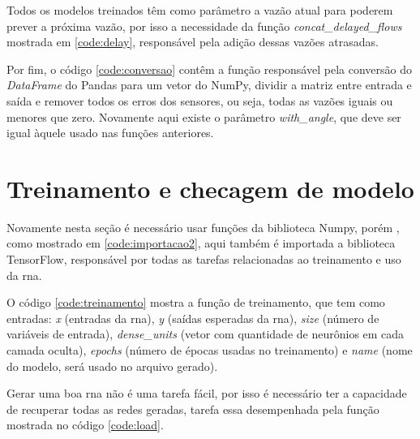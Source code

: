 \documentclass[12pt]{article}
\begin{document}


Todos os modelos treinados têm como parâmetro a vazão atual para poderem prever a próxima vazão, por isso a necessidade da função \textit{concat\_delayed\_flows} mostrada em \ref{code:delay}, responsável pela adição dessas vazões atrasadas.



Por fim, o código \ref{code:conversao} contêm a função responsável pela conversão do \textit{DataFrame} do Pandas para um vetor do NumPy, dividir a matriz entre entrada e saída e remover todos os erros dos sensores, ou seja, todas as vazões iguais ou menores que zero.
Novamente aqui existe o parâmetro \textit{with\_angle}, que deve ser igual àquele usado nas funções anteriores.

\section{Treinamento e checagem de modelo}



Novamente nesta seção é necessário usar funções da biblioteca Numpy, porém , como mostrado em \ref{code:importacao2}, aqui também é importada a biblioteca TensorFlow, responsável por todas as tarefas relacionadas ao treinamento e uso da \acrshort{rna}.



O código \ref{code:treinamento} mostra a função de treinamento, que tem como entradas: \textit{x} (entradas da \acrshort{rna}), \textit{y} (saídas esperadas da \acrshort{rna}), \textit{size} (número de variáveis de entrada), \textit{dense\_units} (vetor com quantidade de neurônios em cada camada oculta), \textit{epochs} (número de épocas usadas no treinamento) e \textit{name} (nome do modelo, será usado no arquivo gerado).




Gerar uma boa \acrshort{rna} não é uma tarefa fácil, por isso é necessário ter a capacidade de recuperar todas as redes geradas, tarefa essa desempenhada pela função mostrada no código \ref{code:load}.
\end{document}
